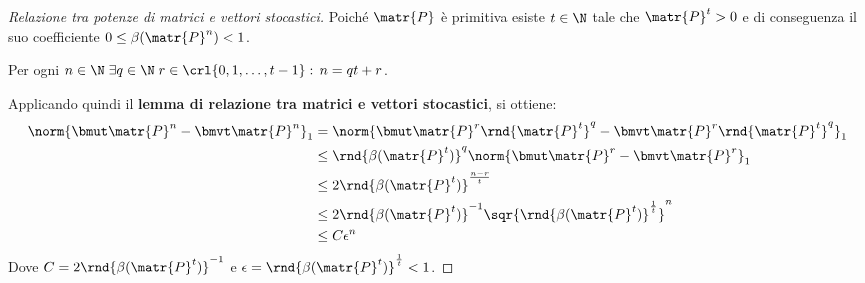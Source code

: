 \documentclass[\main/main.tex]{subfiles}
\begin{document}
\begin{proof}[Relazione tra potenze di matrici e vettori stocastici]
  Poiché \(\matr{P}\) è primitiva esiste \(t \in \N \) tale che \(\matr{P}^t > 0\) e di conseguenza il suo coefficiente \(0\leq\beta(\matr{P}^n)<1\).

  Per ogni \(n \in \N \; \exists q \in \N\; r \in \crl{0, 1, \ldots, t-1}: \, n = qt + r\).

  Applicando quindi il \textbf{lemma di relazione tra matrici e vettori stocastici}, si ottiene:
  \begin{align*}
    \norm{\bmut \matr{P}^n - \bmvt \matr{P}^n}_1 & = \norm{\bmut \matr{P}^r\rnd{\matr{P}^t}^q - \bmvt\matr{P}^r\rnd{\matr{P}^t}^q}_1 \\
                                                 & \leq \rnd{\beta(\matr{P}^t)}^q \norm{\bmut \matr{P}^r - \bmvt \matr{P}^r}_1       \\
                                                 & \leq 2\rnd{\beta(\matr{P}^t)}^{\frac{n-r}{t}}                                     \\
                                                 & \leq 2\rnd{\beta(\matr{P}^t)}^{-1} \sqr{\rnd{\beta(\matr{P}^t)}^{\frac{1}{t}}}^n  \\
                                                 & \leq C\epsilon^n                                                                  \\
  \end{align*}
  Dove \(C = 2\rnd{\beta(\matr{P}^t)}^{-1}\) e \(\epsilon = \rnd{\beta(\matr{P}^t)}^{\frac{1}{t}} <1\).
\end{proof}
\end{document}
